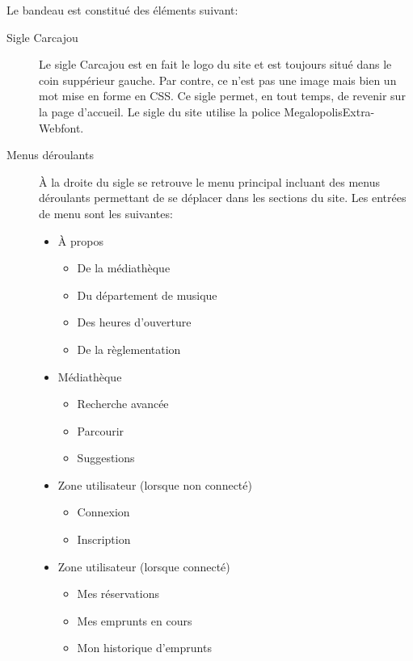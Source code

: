 \documentclass[letter, 11pt]{report}
\begin{document}
Le bandeau est constitué des éléments suivant:
\begin{description}
	\item[Sigle Carcajou] Le sigle Carcajou est en fait le logo du site et est toujours situé dans le coin suppérieur gauche. Par contre, ce n'est pas une image mais bien un mot mise en forme en CSS. Ce sigle permet, en tout temps, de revenir sur la page d'accueil. Le sigle du site utilise la police MegalopolisExtra-Webfont.
	\item[Menus déroulants]À la droite du sigle se retrouve le menu principal incluant des menus déroulants permettant de se déplacer dans les sections du site. Les entrées de menu sont les suivantes:
		\begin{itemize}
			\item À propos
				\begin{itemize}
					\item De la médiathèque
					\item Du département de musique
					\item Des heures d'ouverture
					\item De la règlementation
				\end{itemize}
		\end{itemize}
		\begin{itemize}
			\item Médiathèque
			\begin{itemize}
				\item Recherche avancée
				\item Parcourir
				\item Suggestions
			\end{itemize}
		\end{itemize}
		\begin{itemize}
			\item Zone utilisateur (lorsque non connecté)
			\begin{itemize}
				\item Connexion
				\item Inscription
			\end{itemize}
		\end{itemize}
		\begin{itemize}
			\item Zone utilisateur (lorsque connecté)
			\begin{itemize}
				\item Mes réservations
				\item Mes emprunts en cours
				\item Mon historique d'emprunts

\end{itemize}
\end{itemize}
\end{description}
\end{document}
